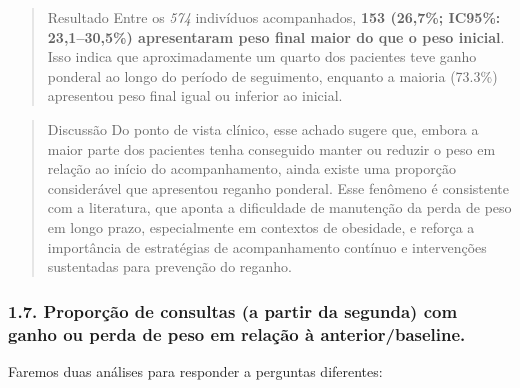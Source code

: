 \documentclass[
]{article}
\begin{document}
\begin{quote}
Resultado Entre os \emph{574} indivíduos acompanhados, \textbf{153
(26,7\%; IC95\%: 23,1--30,5\%) apresentaram peso final maior do que o
peso inicial}. Isso indica que aproximadamente um quarto dos pacientes
teve ganho ponderal ao longo do período de seguimento, enquanto a
maioria (73.3\%) apresentou peso final igual ou inferior ao inicial.
\end{quote}

\begin{quote}
Discussão Do ponto de vista clínico, esse achado sugere que, embora a
maior parte dos pacientes tenha conseguido manter ou reduzir o peso em
relação ao início do acompanhamento, ainda existe uma proporção
considerável que apresentou reganho ponderal. Esse fenômeno é
consistente com a literatura, que aponta a dificuldade de manutenção da
perda de peso em longo prazo, especialmente em contextos de obesidade, e
reforça a importância de estratégias de acompanhamento contínuo e
intervenções sustentadas para prevenção do reganho.
\end{quote}

\subsubsection{1.7. Proporção de consultas (a partir da segunda) com
ganho ou perda de peso em relação à
anterior/baseline.}\label{proporuxe7uxe3o-de-consultas-a-partir-da-segunda-com-ganho-ou-perda-de-peso-em-relauxe7uxe3o-uxe0-anteriorbaseline.}

Faremos duas análises para responder a perguntas diferentes:
\end{document}
